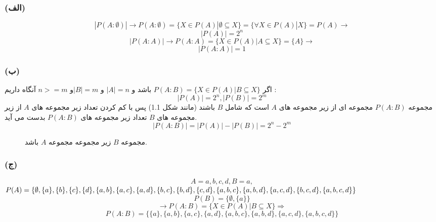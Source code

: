 \documentclass{article}
\begin{document}
            \subsubsection*{(الف)}
                \[|P(A:\emptyset)| \rightarrow P(A:\emptyset) = \{X \in P(A) | \emptyset \subseteq X\} = \{\forall X \in P(A) | X\} = P(A) \rightarrow \]
                \[|P(A)| = 2^n\]
                \[|P(A:A)| \rightarrow P(A:A) = \{X \in P(A) | A \subseteq X\} = \{A\} \rightarrow\]
                \[|P(A:A)| = 1\]
            
            \subsubsection*{(ب)}
                اگر $P(A:B) = \{X \in P(A) | B \subseteq X\}$ باشد و $|A|=n$ و $|B|=m$و $n >= m$ آنگاه داریم :
                \[|P(A)| = 2^n, |P(B)| = 2^m\]
                مجموعه $P(A:B)$ مجموعه ای از زیر مجموعه های $A$ است که شامل $B$ باشند (مانند شکل 1.1) پس با کم کردن تعداد زیر مجموعه های $A$ از زیر مجموعه های $B$ تعداد زیر مجموعه های $P(A:B)$ بدست می آید.
                \[|P(A:B)| = |P(A)| - |P(B)| = 2^n - 2^m\]

                \begin{figure}[ht]
                \centering
                    \begin{latin}
                    \end{latin}

                    \renewcommand{\thefigure}{1.1}
                    \caption{مجموعه $B$ زیر مجموعه مجموعه $A$ باشد.}
                \end{figure}
            
            \subsubsection*{(ج)}
                \[A = {a, b, c, d}, B = {a},\]
                $P(A) = \{\emptyset, \{a\}, \{b\}, \{c\}, \{d\}, \{a, b\}, \{a, c\}, \{a, d\}, \{b, c\}, \{b, d\}, \{c, d\}, \\ \{a, b, c\}, \{a, b, d\}, \{a, c, d\}, \{b, c, d\}, \{a, b, c, d\}\}$\\
                \[P(B) = \{\emptyset, \{a\}\}\]
                \[\rightarrow P(A:B) = \{X \in P(A) | B \subseteq X\} \Rightarrow \]
                \[P(A:B) = \{\{a\}, \{a, b\}, \{a, c\}, \{a, d\}, \{a, b, c\}, \{a, b, d\}, \{a, c, d\}, \{a, b, c, d\}\}\]
\end{document}
